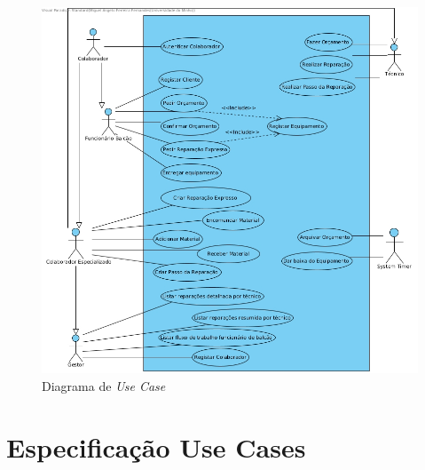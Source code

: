 \documentclass[a4paper,12pt]{scrreprt}
\begin{document}
\begin{figure}[!ht]
    \centering
    \includegraphics[scale=0.45]{dss-usecase.jpg}
    \caption{Diagrama de \textit{Use Case}}
\end{figure}

\section{Especificação Use Cases}
\end{document}
